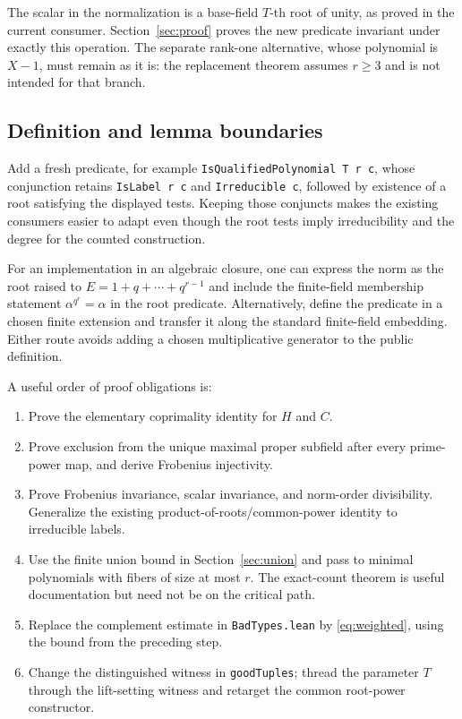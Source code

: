 \documentclass[11pt,a4paper]{article}
\newcommand{\src}[1]{\nolinkurl{#1}}
\theoremstyle{definition}
\theoremstyle{remark}
\begin{document}
The scalar in the normalization is a base-field $T$-th root of unity,
as proved in the current consumer. Section~\ref{sec:proof} proves the
new predicate invariant under exactly this operation. The separate
rank-one alternative, whose polynomial is $X-1$, must remain as it is:
the replacement theorem assumes $r\ge3$ and is not intended for that
branch.

\subsection{Definition and lemma boundaries}

Add a fresh predicate, for example
\texttt{IsQualifiedPolynomial T r c}, whose conjunction retains
\texttt{IsLabel r c} and \texttt{Irreducible c}, followed by existence of a
root satisfying the displayed tests. Keeping those conjuncts makes the
existing consumers easier to adapt even though the root tests imply
irreducibility and the degree for the counted construction.

For an implementation in an algebraic closure, one can express the norm
as the root raised to $E=1+q+\cdots+q^{r-1}$ and include the finite-field
membership statement $\alpha^{q^r}=\alpha$ in the root predicate.
Alternatively, define the predicate in a chosen finite extension and
transfer it along the standard finite-field embedding. Either route
avoids adding a chosen multiplicative generator to the public definition.

A useful order of proof obligations is:
\begin{enumerate}
\item Prove the elementary coprimality identity for $H$ and $C$.
\item Prove exclusion from the unique maximal proper subfield after
every prime-power map, and derive Frobenius injectivity.
\item Prove Frobenius invariance, scalar invariance, and norm-order
divisibility. Generalize the existing product-of-roots/common-power
identity to irreducible labels.
\item Use the finite union bound in Section~\ref{sec:union} and pass to
minimal polynomials with fibers of size at most $r$. The exact-count
theorem is useful documentation but need not be on the critical path.
\item Replace the complement estimate in \src{BadTypes.lean} by
\eqref{eq:weighted}, using the bound from the preceding step.
\item Change the distinguished witness in \src{goodTuples}; thread the
parameter $T$ through the lift-setting witness and retarget the common
root-power constructor.
\end{enumerate}
\end{document}
